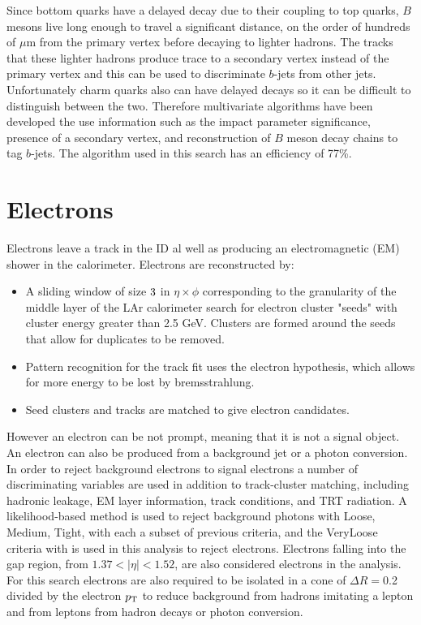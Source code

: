 Since bottom quarks have a delayed decay due to their coupling to top quarks, $B$ mesons live long enough to travel a significant distance, on the order of hundreds of $\mu$m from the primary vertex before decaying to lighter hadrons.  The tracks that these lighter hadrons produce trace to a secondary vertex instead of the primary vertex and this can be used to discriminate $b$-jets from other jets.  Unfortunately charm quarks also can have delayed decays so it can be difficult to distinguish between the two.  Therefore multivariate algorithms have been developed\cite{btagging} the use information such as the impact parameter significance, presence of a secondary vertex, and reconstruction of $B$ meson decay chains to tag $b$-jets.  The algorithm used in this search has an efficiency of 77\%.

\section{Electrons}
\label{sec:elec}

Electrons leave a track in the ID al well as producing an electromagnetic (EM) shower in the calorimeter.  Electrons are reconstructed by\cite{ATLAS-CONF-2016-024}:

\begin{itemize}
	\item A sliding window of size $3 \time 5$ in $\eta \times \phi$ corresponding to the granularity of the middle layer of the LAr calorimeter search for electron cluster "seeds" with cluster energy greater than 2.5 GeV.  Clusters are formed around the seeds that allow for duplicates to be removed.
	\item Pattern recognition for the track fit uses the electron hypothesis, which allows for more energy to be lost by bremsstrahlung.  
	\item Seed clusters and tracks are matched to give electron candidates.  
\end{itemize}

However an electron can be not prompt, meaning that it is not a signal object. An electron can also be produced from a background jet or a photon conversion.  In order to reject background electrons to signal electrons a number of discriminating variables are used in addition to track-cluster matching, including hadronic leakage, EM layer information, track conditions, and TRT radiation. A likelihood-based method is used to reject background photons with Loose, Medium, Tight, with each a subset of previous criteria, and the VeryLoose criteria with is used in this analysis to reject electrons.  Electrons falling into the gap region, from $1.37 < |\eta| < 1.52$, are also considered electrons in the analysis.  For this search electrons are also required to be isolated in a cone of $\Delta R=$0.2 divided by the electron $p_{\mathrm{T}}$ to reduce background from hadrons imitating a lepton and from leptons from hadron decays or photon conversion.  \\

